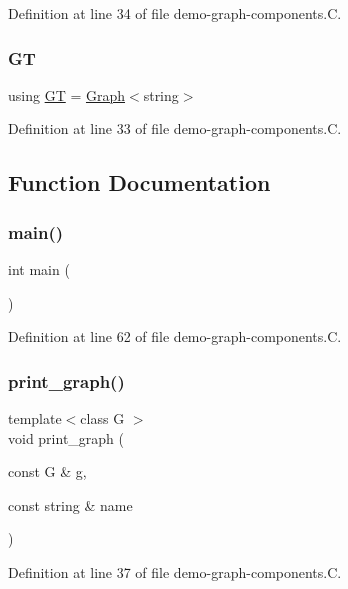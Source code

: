 Definition at line 34 of file demo-\/graph-\/components.\+C.

\mbox{\label{demo-graph-components_8_c_a668102de43ec3f9488fff7b515d48859}} 
\subsubsection{\texorpdfstring{GT}{GT}}
{\footnotesize\ttfamily using \hyperlink{demo-buildgraph_8_c_a3001c40d2c31ca87ed96cd7d1334a55e}{GT} =  \hyperlink{class_designar_1_1_graph}{Graph}$<$string$>$}



Definition at line 33 of file demo-\/graph-\/components.\+C.



\subsection{Function Documentation}
\mbox{\label{demo-graph-components_8_c_ae66f6b31b5ad750f1fe042a706a4e3d4}} 
\subsubsection{\texorpdfstring{main()}{main()}}
{\footnotesize\ttfamily int main (\begin{DoxyParamCaption}{ }\end{DoxyParamCaption})}



Definition at line 62 of file demo-\/graph-\/components.\+C.

\mbox{\label{demo-graph-components_8_c_af4aa6ad85cbef3cd03726e2b31004df6}} 
\subsubsection{\texorpdfstring{print\+\_\+graph()}{print\_graph()}}
{\footnotesize\ttfamily template$<$class G $>$ \\
void print\+\_\+graph (\begin{DoxyParamCaption}\item[{const G \&}]{g,  }\item[{const string \&}]{name }\end{DoxyParamCaption})}



Definition at line 37 of file demo-\/graph-\/components.\+C.

